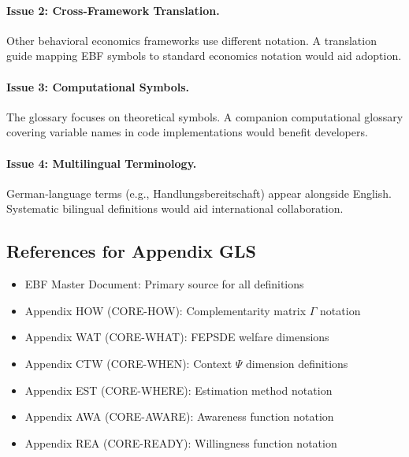 \paragraph{Issue 2: Cross-Framework Translation.}
Other behavioral economics frameworks use different notation. A translation guide
mapping EBF symbols to standard economics notation would aid adoption.

\paragraph{Issue 3: Computational Symbols.}
The glossary focuses on theoretical symbols. A companion computational glossary
covering variable names in code implementations would benefit developers.

\paragraph{Issue 4: Multilingual Terminology.}
German-language terms (e.g., Handlungsbereitschaft) appear alongside English.
Systematic bilingual definitions would aid international collaboration.


\subsection{References for Appendix GLS}
\label{sec:glossary-references}

\begin{itemize}[nosep]
    \item EBF Master Document: Primary source for all definitions
    \item Appendix HOW (CORE-HOW): Complementarity matrix $\Gamma$ notation
    \item Appendix WAT (CORE-WHAT): FEPSDE welfare dimensions
    \item Appendix CTW (CORE-WHEN): Context $\Psi$ dimension definitions
    \item Appendix EST (CORE-WHERE): Estimation method notation
    \item Appendix AWA (CORE-AWARE): Awareness function notation
    \item Appendix REA (CORE-READY): Willingness function notation
\end{itemize}

